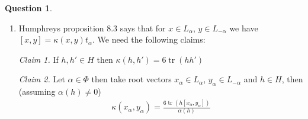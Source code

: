\documentclass[10.5pt]{article}
\theoremstyle{definition}
\newtheorem{pb}{Question}
\numberwithin{example}{subsection}
\numberwithin{proposition}{subsection}
\newcommand{\gen}[1]{\langle#1\rangle}
\begin{document}
\begin{pb}
\begin{enumerate}
            \begin{align}
                \begin{pmatrix} 2 & -2 \\ -1 & 2 \end{pmatrix}
            \end{align}
            Now it is trivial to compute the Dynkin diagram of \(\Phi\) by using the procedure described in Humphreys 11.2, since \(\dim \operatorname{span}_F \Phi = 2\) the number of simple roots we start with two vertices, and draw \(\gen{\alpha_1,\alpha_2}\gen{\alpha_2,\alpha_1} = (-1)(-2) = 2\) lines between them. Now all that remains is to draw an arrow towards the shorter root, in this case \((\alpha_1,\alpha_1) = \frac16 < \frac13 = (\alpha_2,\alpha_2)\) so the arrow is from \(\alpha_2\) to \(\alpha_1\), the diagram given from this procedure is drawn below (I am using the Dynkin Diagrams tikz package):
            \begin{align}
                \dynkin[scale = 4] C2 \label{C2}
            \end{align}
            Which is of type C2. \qed

            \item Humphreys proposition 8.3 says that for \(x \in L_\alpha\), \(y \in L_{-\alpha}\) we have \([x,y] = \kappa(x,y)t_\alpha\). We need the following claims:
            
            \emph{Claim 1.} If \(h,h' \in H\) then \(\kappa(h,h') = 6 \operatorname{tr}(hh')\)

            \emph{Claim 2.} Let \(\alpha \in \Phi\) then take root vectors \(x_\alpha \in L_\alpha\), \(y_\alpha \in L_{-\alpha}\) and \(h \in H\), then (assuming \(\alpha(h) \neq 0\))
            \begin{align}
                \kappa(x_\alpha,y_\alpha) = \frac{6 \operatorname{tr}(h[x_\alpha,y_\alpha])}{\alpha(h)}
            \end{align}


\end{enumerate}
\end{pb}
\end{document}
